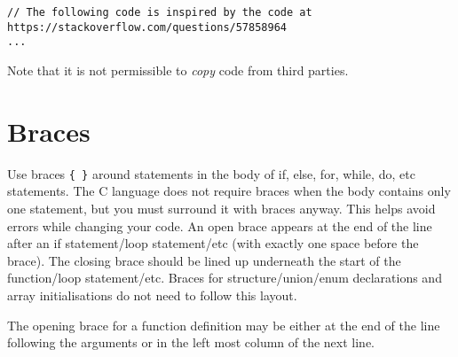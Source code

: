 \documentclass{article}
\begin{document}
\begin{lstlisting}
// The following code is inspired by the code at https://stackoverflow.com/questions/57858964
...
\end{lstlisting}

Note that it is not permissible to \textit{copy} code from third parties.

\section{Braces}
Use braces \texttt{\{ \}} around statements in the body of if, else, for, while, do, etc statements.
The C language does not require braces when the body contains only one statement, but you must 
surround it with braces anyway.
This helps avoid errors while changing your code.
An open brace appears at the end of the line after an if statement/loop statement/etc (with exactly 
one space before the brace).
The closing brace should be lined up underneath the start of the function/loop statement/etc.
Braces for structure/union/enum declarations and array initialisations do not need to follow this layout.

The opening brace for a function definition may be either at the end of the line following the 
arguments or in the left most column of the next line.
\end{document}
